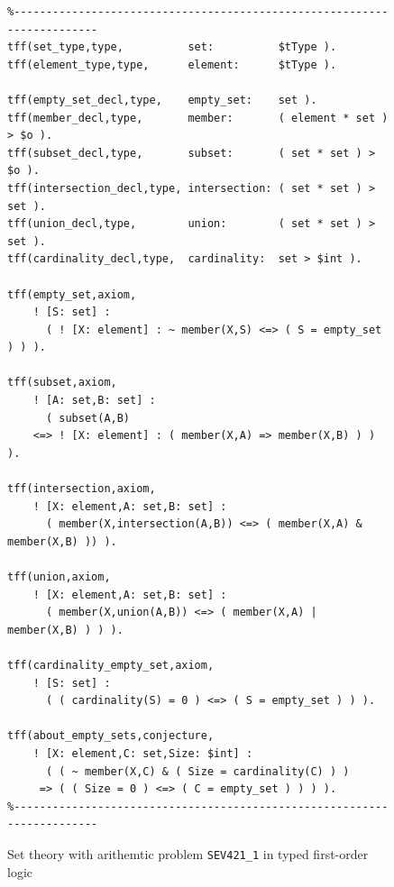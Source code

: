 \documentclass[runningheads]{llncs}
\begin{document}
\begin{figure}[htb]
\centering
{\footnotesize
{\setlength{\baselineskip}{3mm}
\begin{verbatim}
%------------------------------------------------------------------------
tff(set_type,type,          set:          $tType ).
tff(element_type,type,      element:      $tType ).

tff(empty_set_decl,type,    empty_set:    set ).
tff(member_decl,type,       member:       ( element * set ) > $o ).
tff(subset_decl,type,       subset:       ( set * set ) > $o ).
tff(intersection_decl,type, intersection: ( set * set ) > set ).
tff(union_decl,type,        union:        ( set * set ) > set ).
tff(cardinality_decl,type,  cardinality:  set > $int ).

tff(empty_set,axiom,
    ! [S: set] :
      ( ! [X: element] : ~ member(X,S) <=> ( S = empty_set ) ) ).

tff(subset,axiom,
    ! [A: set,B: set] :
      ( subset(A,B)
    <=> ! [X: element] : ( member(X,A) => member(X,B) ) ) ).

tff(intersection,axiom,
    ! [X: element,A: set,B: set] :
      ( member(X,intersection(A,B)) <=> ( member(X,A) & member(X,B) )) ).

tff(union,axiom,
    ! [X: element,A: set,B: set] :
      ( member(X,union(A,B)) <=> ( member(X,A) | member(X,B) ) ) ).

tff(cardinality_empty_set,axiom,
    ! [S: set] :
      ( ( cardinality(S) = 0 ) <=> ( S = empty_set ) ) ).

tff(about_empty_sets,conjecture,
    ! [X: element,C: set,Size: $int] :
      ( ( ~ member(X,C) & ( Size = cardinality(C) ) )
     => ( ( Size = 0 ) <=> ( C = empty_set ) ) ) ).
%------------------------------------------------------------------------
\end{verbatim}
}}
\caption{Set theory with arithemtic problem {\tt SEV421\_1} in typed first-order logic}
\label{ExampleTF0}
\end{figure}
\end{document}
